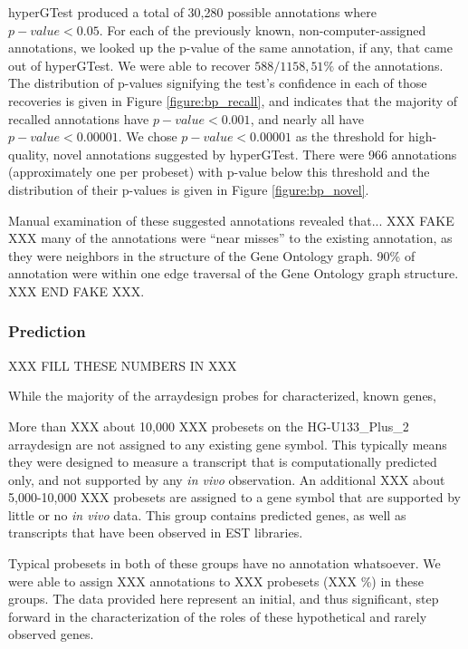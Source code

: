 \documentclass{article}
\begin{document}
hyperGTest produced a total of 30,280 possible annotations where $p-value <
0.05$.  For each of the previously known, non-computer-assigned annotations, we
looked up the p-value of the same annotation, if any, that came out of
hyperGTest.  We were able to recover $588/1158, 51\%$ of the annotations.
The distribution of p-values signifying the test's confidence in each of those
recoveries is given in Figure \ref{figure:bp_recall}, and indicates that the
majority of recalled annotations have $p-value < 0.001$, and nearly all have
$p-value < 0.00001$.  We chose $p-value < 0.00001$ as the threshold for
high-quality, novel annotations suggested by hyperGTest.  There were 966
annotations (approximately one per probeset) with p-value below this threshold
and the distribution of their p-values is given in Figure
\ref{figure:bp_novel}.

Manual examination of these suggested annotations revealed that...
XXX FAKE XXX
many of the annotations were ``near misses'' to the existing annotation, as
they were neighbors in the structure of the Gene Ontology graph.  90\% of
annotation were within one edge traversal of the Gene Ontology graph structure.
XXX END FAKE XXX.

\subsubsection{Prediction}\label{Prediction}

XXX FILL THESE NUMBERS IN XXX

While the majority of the arraydesign probes for characterized, known genes,

More than XXX about 10,000 XXX probesets on the HG-U133\_Plus\_2 arraydesign are not
assigned to any existing gene symbol.  This typically means they were designed
to measure a transcript that is computationally predicted only, and not
supported by any \emph{in vivo} observation.  An additional XXX about
5,000-10,000 XXX probesets are assigned to a gene symbol that are supported by
little or no \emph{in vivo} data.  This group contains predicted genes, as well
as transcripts that have been observed in EST libraries.

Typical probesets in both of these groups have no annotation whatsoever.  We
were able to assign XXX annotations to XXX probesets (XXX \%) in these groups.
The data provided here represent an initial, and thus significant, step forward
in the characterization of the roles of these hypothetical and rarely observed
genes.
\end{document}
